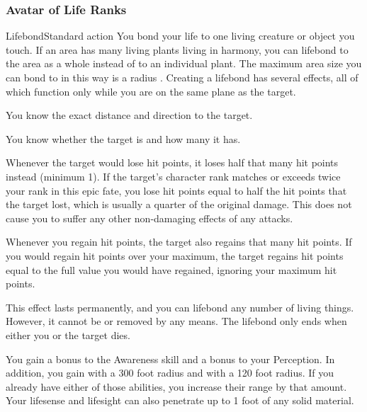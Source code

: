     \subsubsection{Avatar of Life Ranks}
      \begin{magicalactiveability}{Lifebond}{Standard action}
        \rankline
        You bond your life to one living creature or object you touch.
        If an area has many living plants living in harmony, you can lifebond to the area as a whole instead of to an individual plant.
        The maximum area size you can bond to in this way is a \hugearea radius .
        Creating a lifebond has several effects, all of which function only while you are on the same plane as the target.
        \begin{raggeditemize}
          \item You know the exact distance and direction to the target.
          \item You know whether the target is  and how many  it has.
          \item Whenever the target would lose hit points, it loses half that many hit points instead (minimum 1).
            If the target's character rank matches or exceeds twice your rank in this epic fate, you lose hit points equal to half the hit points that the target lost, which is usually a quarter of the original damage.
            This does not cause you to suffer any other non-damaging effects of any attacks.
          \item Whenever you regain hit points, the target also regains that many hit points.
            If you would regain hit points over your maximum, the target regains hit points equal to the full value you would have regained, ignoring your maximum hit points.
        \end{raggeditemize}

        This effect lasts permanently, and you can lifebond any number of living things.
        However, it cannot be  or removed by any means.
        The lifebond only ends when either you or the target dies.
      \end{magicalactiveability}

       You gain a  bonus to the Awareness skill and a  bonus to your Perception.
      In addition, you gain  with a 300 foot radius and  with a 120 foot radius.
      If you already have either of those abilities, you increase their range by that amount.
      Your lifesense and lifesight can also penetrate up to 1 foot of any solid material.

